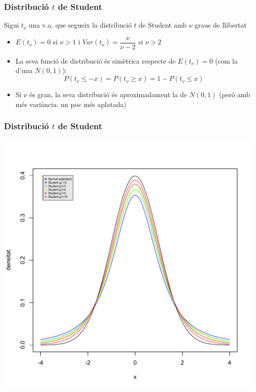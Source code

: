 \documentclass[12pt,t]{beamer}
\renewcommand{\leq}{\leqslant}
\renewcommand{\geq}{\geqslant}
\theoremstyle{plain}
\theoremstyle{definition}
\begin{document}
\begin{frame}
\frametitle{Distribució $t$ de Student}

Sigui $t_{\nu}$ una v.a. que segueix la distribució $t$ de
Student amb $\nu$ graus de llibertat
\medskip

\begin{itemize}
\item $E(t_{\nu})=0$  si $\nu>1$ i $Var(t_{\nu})=\dfrac{\nu}{\nu-2}$ si $\nu>2$
\medskip

\item La seva funció de distribució és simètrica respecte de $E(t_{\nu})=0$ (com la d'una $N(0,1)$):
$$
P(t_{\nu}\leq -x)=P(t_{\nu}\geq x)=1-P(t_{\nu}\leq x)
$$

\item Si $\nu$ és gran, la seva distribució és aproximadament la de $N(0,1)$ (però amb més variància: un poc més aplatada)
\end{itemize}

\end{frame}

\begin{frame}
\frametitle{Distribució $t$ de Student}
\vspace*{-1cm}

\includegraphics[width=0.95\linewidth]{tstud-div.pdf}
\end{frame}
\end{document}
